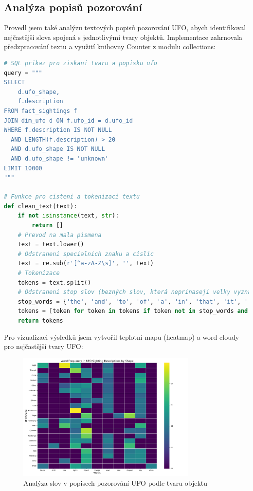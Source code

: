 \documentclass[a4paper,12pt]{article}
\begin{document}
\subsection{Analýza popisů pozorování}
Provedl jsem také analýzu textových popisů pozorování UFO, abych identifikoval nejčastější slova spojená s jednotlivými tvary objektů. Implementace zahrnovala předzpracování textu a využití knihovny Counter z modulu collections:

\begin{lstlisting}[language=python, caption=Kód pro analýzu textových popisů]
# SQL prikaz pro ziskani tvaru a popisku ufo
query = """
SELECT 
    d.ufo_shape,
    f.description
FROM fact_sightings f
JOIN dim_ufo d ON f.ufo_id = d.ufo_id
WHERE f.description IS NOT NULL 
  AND LENGTH(f.description) > 20
  AND d.ufo_shape IS NOT NULL
  AND d.ufo_shape != 'unknown'
LIMIT 10000
"""

# Funkce pro cisteni a tokenizaci textu
def clean_text(text):
    if not isinstance(text, str):
        return []
    # Prevod na mala pismena
    text = text.lower()
    # Odstraneni specialnich znaku a cislic
    text = re.sub(r'[^a-zA-Z\s]', '', text)
    # Tokenizace
    tokens = text.split()
    # Odstraneni stop slov (bezných slov, která neprinaseji velky vyznam)
    stop_words = {'the', 'and', 'to', 'of', 'a', 'in', 'that', 'it', '...'}
    tokens = [token for token in tokens if token not in stop_words and len(token) > 2]
    return tokens
\end{lstlisting}

Pro vizualizaci výsledků jsem vytvořil teplotní mapu (heatmap) a word cloudy pro nejčastější tvary UFO:

\begin{figure}[h]
\centering
\includegraphics[width=0.8\textwidth]{../images/ufo_description_analysis.png}
\caption{Analýza slov v popisech pozorování UFO podle tvaru objektu}
\end{figure}
\end{document}
